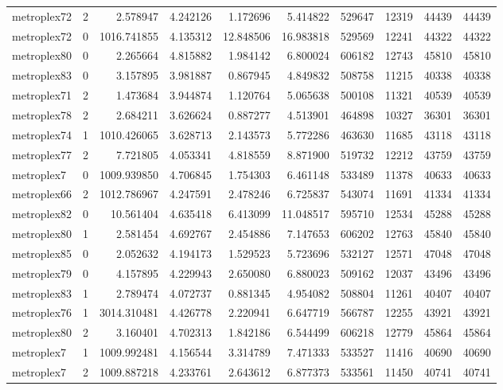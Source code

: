\documentclass[../../../thesis.tex]{subfiles}
\begin{document}
\begin{longtable}{|l|r|r|r|r|r|r|r|r|r|}
metroplex72 & 2 & 2.578947 & 4.242126 & 1.172696 & 5.414822 & 529647 & 12319 & 44439 & 44439 \\
metroplex72 & 0 & 1016.741855 & 4.135312 & 12.848506 & 16.983818 & 529569 & 12241 & 44322 & 44322 \\
metroplex80 & 0 & 2.265664 & 4.815882 & 1.984142 & 6.800024 & 606182 & 12743 & 45810 & 45810 \\
metroplex83 & 0 & 3.157895 & 3.981887 & 0.867945 & 4.849832 & 508758 & 11215 & 40338 & 40338 \\
metroplex71 & 2 & 1.473684 & 3.944874 & 1.120764 & 5.065638 & 500108 & 11321 & 40539 & 40539 \\
metroplex78 & 2 & 2.684211 & 3.626624 & 0.887277 & 4.513901 & 464898 & 10327 & 36301 & 36301 \\
metroplex74 & 1 & 1010.426065 & 3.628713 & 2.143573 & 5.772286 & 463630 & 11685 & 43118 & 43118 \\
metroplex77 & 2 & 7.721805 & 4.053341 & 4.818559 & 8.871900 & 519732 & 12212 & 43759 & 43759 \\
metroplex7 & 0 & 1009.939850 & 4.706845 & 1.754303 & 6.461148 & 533489 & 11378 & 40633 & 40633 \\
metroplex66 & 2 & 1012.786967 & 4.247591 & 2.478246 & 6.725837 & 543074 & 11691 & 41334 & 41334 \\
metroplex82 & 0 & 10.561404 & 4.635418 & 6.413099 & 11.048517 & 595710 & 12534 & 45288 & 45288 \\
metroplex80 & 1 & 2.581454 & 4.692767 & 2.454886 & 7.147653 & 606202 & 12763 & 45840 & 45840 \\
metroplex85 & 0 & 2.052632 & 4.194173 & 1.529523 & 5.723696 & 532127 & 12571 & 47048 & 47048 \\
metroplex79 & 0 & 4.157895 & 4.229943 & 2.650080 & 6.880023 & 509162 & 12037 & 43496 & 43496 \\
metroplex83 & 1 & 2.789474 & 4.072737 & 0.881345 & 4.954082 & 508804 & 11261 & 40407 & 40407 \\
metroplex76 & 1 & 3014.310481 & 4.426778 & 2.220941 & 6.647719 & 566787 & 12255 & 43921 & 43921 \\
metroplex80 & 2 & 3.160401 & 4.702313 & 1.842186 & 6.544499 & 606218 & 12779 & 45864 & 45864 \\
metroplex7 & 1 & 1009.992481 & 4.156544 & 3.314789 & 7.471333 & 533527 & 11416 & 40690 & 40690 \\
metroplex7 & 2 & 1009.887218 & 4.233761 & 2.643612 & 6.877373 & 533561 & 11450 & 40741 & 40741 \\

\end{longtable}
\end{document}
